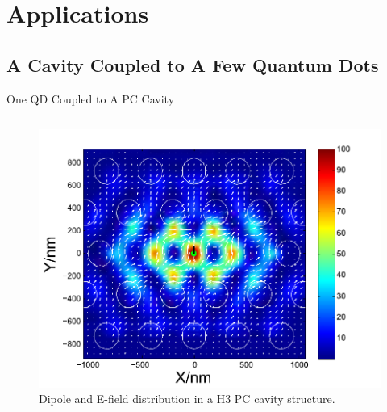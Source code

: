\documentclass{beamer}
\begin{document}
\section{Applications}


\subsection{A Cavity Coupled to A Few Quantum Dots}
\begin{frame}{One QD Coupled to A PC Cavity}
\begin{columns}
\begin{figure}[H]
\centering
\begin{center}
\includegraphics[width=1.1\textwidth]{./Figs/dotsmode1_1}
\end{center}
\caption[Dipole and E-field distributions in a H3 PC cavity structure.]{Dipole and E-field distribution in a H3 PC cavity structure.}
\label{dotsmode1_1}
\end{figure}


\end{columns}
\end{frame}
\end{document}
